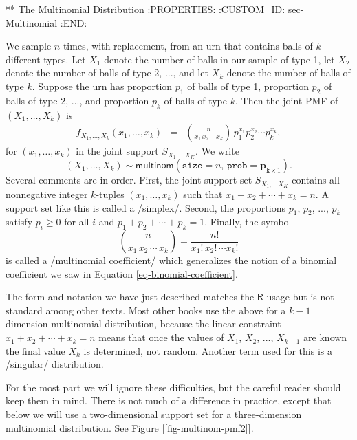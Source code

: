 ** The Multinomial Distribution
:PROPERTIES:
:CUSTOM_ID: sec-Multinomial
:END:

We sample \(n\) times, with replacement, from an urn that contains
balls of \(k\) different types. Let \(X_{1}\) denote the number of
balls in our sample of type 1, let \(X_{2}\) denote the number of
balls of type 2, ..., and let \(X_{k}\) denote the number of balls of
type \(k\). Suppose the urn has proportion \(p_{1}\) of balls of type
1, proportion \(p_{2}\) of balls of type 2, ..., and proportion
\(p_{k}\) of balls of type \(k\). Then the joint PMF of
\((X_{1},\ldots,X_{k})\) is
\begin{eqnarray}
f_{X_{1},\ldots,X_{k}}(x_{1},\ldots,x_{k}) & = & {n \choose x_{1}\, x_{2}\,\cdots\, x_{k}}\, p_{1}^{x_{1}}p_{2}^{x_{2}}\cdots p_{k}^{x_{k}},
\end{eqnarray}
for \((x_{1},\ldots,x_{k})\) in the joint support \(S_{X_{1},\ldots X_{K}}\). We write
\begin{equation}
(X_{1},\ldots,X_{k})\sim\mathsf{multinom}(\mathtt{size}=n,\,\mathtt{prob}=\mathbf{p}_{\mathrm{k}\times1}).
\end{equation}
Several comments are in order. First, the joint support set
\(S_{X_{1},\ldots X_{K}}\) contains all nonnegative integer
\(k\)-tuples \((x_{1},\ldots,x_{k})\) such that
\(x_{1}+x_{2}+\cdots+x_{k}=n\). A support set like this is called a
/simplex/. Second, the proportions \(p_{1}\), \(p_{2}\), ...,
\(p_{k}\) satisfy \(p_{i}\geq0\) for all \(i\) and
\(p_{1}+p_{2}+\cdots+p_{k}=1\). Finally, the symbol
\begin{equation}
{n \choose x_{1}\, x_{2}\,\cdots\, x_{k}}=\frac{n!}{x_{1}!\, x_{2}!\,\cdots x_{k}!}
\end{equation}
is called a /multinomial coefficient/ which generalizes the notion of
a binomial coefficient we saw in Equation
\eqref{eq-binomial-coefficient}.

The form and notation we have just described matches the
\(\mathsf{R}\) usage but is not standard among other texts. Most other
books use the above for a \(k-1\) dimension multinomial distribution,
because the linear constraint \(x_{1}+x_{2}+\cdots+x_{k}=n\) means
that once the values of \(X_{1}\), \(X_{2}\), ..., \(X_{k-1}\) are
known the final value \(X_{k}\) is determined, not random. Another
term used for this is a /singular/ distribution.

For the most part we will ignore these difficulties, but the careful
reader should keep them in mind. There is not much of a difference in
practice, except that below we will use a two-dimensional support set
for a three-dimension multinomial distribution. See Figure
[[fig-multinom-pmf2]].

